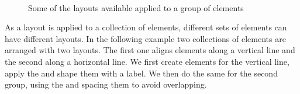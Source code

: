 \documentclass[a4paper,10pt,twoside]{book}
\begin{document}
\begin{figure}[h]
        \centering
		 \hfill
		\hfill
		 \\ 
		 \hfill
		\hfill
        \caption{Some of the layouts available applied to a group of elements}\label{fig:roLayouts}
\end{figure}

As a layout is applied to a collection of elements, different sets of elements can have different layouts. In the following example two collections of elements are arranged with two layouts. The first one aligns elements along a vertical line and the second along a horizontal line. 
We first create elements for the vertical line, apply the  and shape them with a label. We then do the same for the second group, using the  and spacing them to avoid overlapping.
\end{document}
